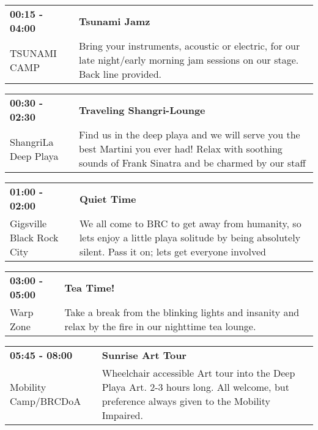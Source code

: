 \begin{tabular}{ p{1in} p{2.2in} }
    \textbf{00:15 - 04:00} & \textbf{Tsunami Jamz} \\
    TSUNAMI CAMP \newline  & Bring your instruments, acoustic or electric, for our late night/early morning jam sessions on our stage.  Back line provided. \\
    \hline 
\end{tabular}
    
\begin{tabular}{ p{1in} p{2.2in} }
    \textbf{00:30 - 02:30} & \textbf{Traveling Shangri-Lounge} \\
    ShangriLa \newline Deep Playa & Find us in the deep playa and we will serve you the best Martini you ever had! Relax with soothing sounds of Frank Sinatra and be charmed by our staff \\
    \hline 
\end{tabular}
    
\begin{tabular}{ p{1in} p{2.2in} }
    \textbf{01:00 - 02:00} & \textbf{Quiet Time} \\
    Gigsville \newline Black Rock City & We all come to BRC to get away from humanity, so lets enjoy a little playa solitude by being absolutely silent. Pass it on; lets get everyone involved \\
    \hline 
\end{tabular}
    
\begin{tabular}{ p{1in} p{2.2in} }
    \textbf{03:00 - 05:00} & \textbf{Tea Time!} \\
    Warp Zone \newline  & Take a break from the blinking lights and insanity and relax by the fire in our nighttime tea lounge. \\
    \hline 
\end{tabular}
    
\begin{tabular}{ p{1in} p{2.2in} }
    \textbf{05:45 - 08:00} & \textbf{Sunrise Art Tour} \\
    Mobility Camp/BRCDoA \newline  & Wheelchair accessible Art tour into the Deep Playa Art.
2-3 hours long. All welcome, but preference always given to the Mobility Impaired. \\
    \hline 
\end{tabular}
    

